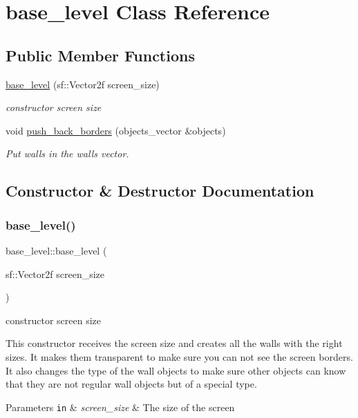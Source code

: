 \hypertarget{classbase__level}{}\section{base\+\_\+level Class Reference}
\label{classbase__level}
\subsection*{Public Member Functions}
\begin{DoxyCompactItemize}
\item 
\hyperlink{classbase__level_addf165fdc5f4e953be3b6a2dcd00459b}{base\+\_\+level} (sf\+::\+Vector2f screen\+\_\+size)
\begin{DoxyCompactList}\small\item\em constructor screen size \end{DoxyCompactList}\item 
void \hyperlink{classbase__level_a3b2da28cf45cad434103e81ee6c4538d}{push\+\_\+back\+\_\+borders} (objects\+\_\+vector \&objects)
\begin{DoxyCompactList}\small\item\em Put walls in the walls vector. \end{DoxyCompactList}\end{DoxyCompactItemize}


\subsection{Constructor \& Destructor Documentation}
\mbox{\label{classbase__level_addf165fdc5f4e953be3b6a2dcd00459b}} 
\subsubsection{\texorpdfstring{base\+\_\+level()}{base\_level()}}
{\footnotesize\ttfamily base\+\_\+level\+::base\+\_\+level (\begin{DoxyParamCaption}\item[{sf\+::\+Vector2f}]{screen\+\_\+size }\end{DoxyParamCaption})}



constructor screen size 

This constructor receives the screen size and creates all the walls with the right sizes. It makes them transparent to make sure you can not see the screen borders. It also changes the type of the wall objects to make sure other objects can know that they are not regular wall objects but of a special type. 
\begin{DoxyParams}[1]{Parameters}
\mbox{\tt in}  & {\em screen\+\_\+size} & The size of the screen \\
\hline
\end{DoxyParams}


